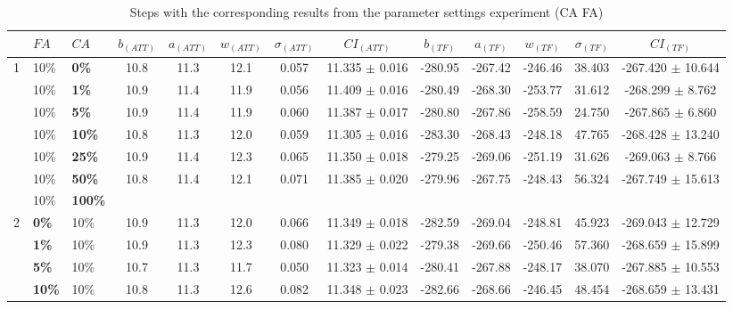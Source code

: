 \begin{sidewaystable}
    \hspace*{-0.5cm}
    \begin{tabular}{|l|l|l||c|c|c|c|c|c|c|c|c|c|}
    \hline
    ~ & $FA$ & $CA$ & $b_{(ATT)}$ & $a_{(ATT)}$ & $w_{(ATT)}$ & $\sigma_{(ATT)}$ & $CI_{(ATT)}$ & $b_{(TF)}$ & $a_{(TF)}$ & $w_{(TF)}$ & $\sigma_{(TF)}$ & $CI_{(TF)}$\\
    \hline
    1 & 10\% & \textbf{0\%} & 10.8 & 11.3 & 12.1 & 0.057 & 11.335 $\pm$ 0.016 & -280.95 & -267.42 & -246.46 & 38.403 & -267.420 $\pm$ 10.644\\
    ~ & 10\% & \textbf{1\%} & 10.9 & 11.4 & 11.9 & 0.056 & 11.409 $\pm$ 0.016 & -280.49 & -268.30 & -253.77 & 31.612 & -268.299 $\pm$ 8.762\\
    ~ & 10\% & \textbf{5\%} & 10.9 & 11.4 & 11.9 & 0.060 & 11.387 $\pm$ 0.017 & -280.80 & -267.86 & -258.59 & 24.750 & -267.865 $\pm$ 6.860\\
    ~ & 10\% & \textbf{10\%} & 10.8 & 11.3 & 12.0 & 0.059 & 11.305 $\pm$ 0.016 & -283.30 & -268.43 & -248.18 & 47.765 & -268.428 $\pm$ 13.240 \\
    ~ & 10\% & \textbf{25\%} & 10.9 & 11.4 & 12.3 & 0.065 & 11.350 $\pm$ 0.018 & -279.25 & -269.06 & -251.19 & 31.626 & -269.063 $\pm$ 8.766 \\
    ~ & 10\% & \textbf{50\%} & 10.8 & 11.4 & 12.1 & 0.071 & 11.385 $\pm$ 0.020 & -279.96 & -267.75 & -248.43 & 56.324 & -267.749 $\pm$ 15.613\\
    ~ & 10\% & \textbf{100\%} & ~ & ~ & ~ & ~ & ~ & ~ & ~ & ~ & ~ & ~ \\
    \hline
    2 & \textbf{0\%} & 10\% & 10.9 & 11.3 & 12.0 & 0.066 & 11.349 $\pm$ 0.018 & -282.59 & -269.04 & -248.81 & 45.923 & -269.043 $\pm$ 12.729 \\
    ~ & \textbf{1\%} & 10\% & 10.9 & 11.3 & 12.3 & 0.080 & 11.329 $\pm$ 0.022 & -279.38 & -269.66 & -250.46 & 57.360 & -268.659 $\pm$ 15.899 \\
    ~ & \textbf{5\%} & 10\% & 10.7 & 11.3 & 11.7 & 0.050 & 11.323 $\pm$ 0.014 & -280.41 & -267.88 & -248.17 & 38.070 & -267.885 $\pm$ 10.553 \\
    ~ & \textbf{10\%} & 10\% & 10.8 & 11.3 & 12.6 & 0.082 & 11.348 $\pm$ 0.023 & -282.66 & -268.66 & -246.45 & 48.454 & -268.659 $\pm$ 13.431 \\
    \hline
    \end{tabular}
    \caption {Steps with the corresponding results from the parameter settings experiment (CA FA)}
    \tiny
    \begin{itemize}[noitemsep]

\end{itemize}
\end{sidewaystable}
